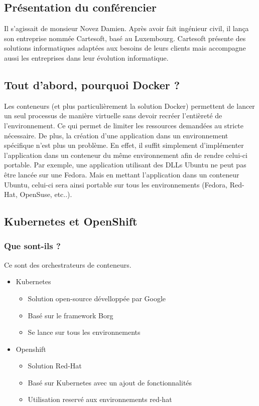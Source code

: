 \documentclass[a4paper]{article}
\begin{document}
\subsection{Présentation du conférencier}
Il s'agissait de monsieur Novez Damien. Après avoir fait ingénieur civil, il lança son entreprise nommée Cartesoft, basé au Luxembourg. Cartesoft présente des solutions informatiques adaptées aux besoins de leurs clients mais accompagne aussi les entreprises dans leur évolution informatique.
\subsection{Tout d'abord, pourquoi Docker ?}
Les conteneurs (et plus particulièrement la solution Docker) permettent de lancer un seul processus de manière virtuelle sans devoir recréer l'entièreté de l'environnement. Ce qui permet de limiter les ressources demandées au stricte nécessaire. De plus, la création d'une application dans un environnement spécifique n'est plus un problème. En effet, il suffit simplement d'implémenter l'application dans un conteneur du même environnement afin de rendre celui-ci portable. Par exemple, une application utilisant des DLLs Ubuntu ne peut pas être lancée sur une Fedora. Mais en mettant l'application dans un conteneur Ubuntu, celui-ci sera ainsi portable sur tous les environnements (Fedora, Red-Hat, OpenSuse, etc..).

\subsection{Kubernetes et OpenShift}
\subsubsection{Que sont-ils ?}
Ce sont des orchestrateurs de conteneurs.
\begin{itemize}
    \item Kubernetes
    \begin{itemize}
        \item Solution open-source dévelloppée par Google
        \item Basé sur le framework Borg
        \item Se lance sur tous les environnements
    \end{itemize}
    \item Openshift
    \begin{itemize}
        \item Solution Red-Hat
        \item Basé sur Kubernetes avec un ajout de fonctionnalités
        \item Utilisation reservé aux environnements red-hat
    \end{itemize}
\end{itemize}
\end{document}
